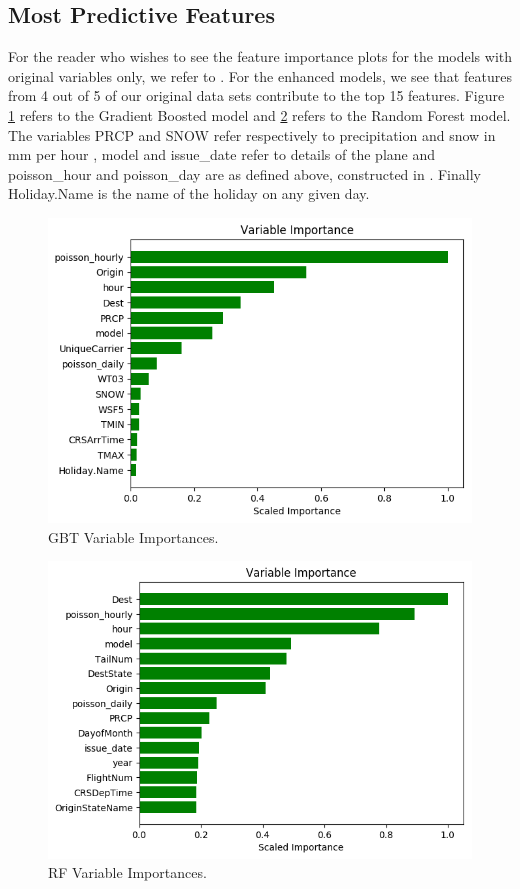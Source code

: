 \documentclass[twocolumn,showpacs,%
  nofootinbib,aps,superscriptaddress,%
  eqsecnum,prd,notitlepage,showkeys,10pt]{revtex4-1}
\begin{document}
\subsection{Most Predictive Features}\label{subsec:feats}

For the reader who wishes to see the feature importance plots for the models with original variables only, we refer to \cite{airline4}. For the enhanced models, we see that features from 4 out of 5 of our original
data sets contribute to the top 15 features. Figure \ref{fig:GB} refers to the Gradient Boosted model and \ref{fig:RF} refers to the Random Forest model. The variables PRCP and SNOW refer respectively to precipitation and snow in mm per hour \cite{weather_readme}, model and issue\_date refer to details of the plane \cite{aviation} and
poisson\_hour and poisson\_day are as defined above, constructed in \cite{airline2}. Finally Holiday.Name is the name of the holiday on any given day. 
\begin{figure}
\includegraphics[scale=0.5]{gb_variables}
\caption{\label{fig:GB}GBT Variable Importances.}
\end{figure}

\begin{figure}
\includegraphics[scale=0.5]{rf_variables}
\caption{\label{fig:RF}RF Variable Importances.}
\end{figure}
\end{document}
